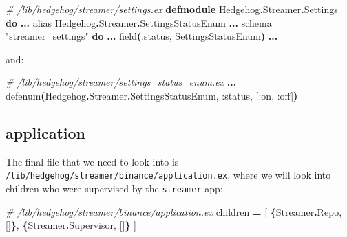 \documentclass[
  oneside]{book}
\newenvironment{Shaded}{\begin{snugshade}}{\end{snugshade}}
\newcommand{\CommentTok}[1]{\textcolor[rgb]{0.56,0.35,0.01}{\textit{#1}}}
\newcommand{\ConstantTok}[1]{\textcolor[rgb]{0.56,0.35,0.01}{#1}}
\newcommand{\FunctionTok}[1]{\textcolor[rgb]{0.13,0.29,0.53}{\textbf{#1}}}
\newcommand{\ImportTok}[1]{#1}
\newcommand{\KeywordTok}[1]{\textcolor[rgb]{0.13,0.29,0.53}{\textbf{#1}}}
\newcommand{\NormalTok}[1]{#1}
\newcommand{\OperatorTok}[1]{\textcolor[rgb]{0.81,0.36,0.00}{\textbf{#1}}}
\newcommand{\OtherTok}[1]{\textcolor[rgb]{0.56,0.35,0.01}{#1}}
\newcommand{\StringTok}[1]{\textcolor[rgb]{0.31,0.60,0.02}{#1}}
\newcommand{\VariableTok}[1]{\textcolor[rgb]{0.00,0.00,0.00}{#1}}
\begin{document}
\begin{Shaded}
\begin{Highlighting}[]
\CommentTok{\# /lib/hedgehog/streamer/settings.ex}
\KeywordTok{defmodule} \ConstantTok{Hedgehog}\OperatorTok{.}\ConstantTok{Streamer}\OperatorTok{.}\ConstantTok{Settings} \KeywordTok{do}
  \OperatorTok{...}
  \ImportTok{alias} \ConstantTok{Hedgehog}\OperatorTok{.}\ConstantTok{Streamer}\OperatorTok{.}\ConstantTok{SettingsStatusEnum}
  \OperatorTok{...}
\NormalTok{  schema }\StringTok{"streamer\_settings"} \KeywordTok{do}
    \OperatorTok{...}
\NormalTok{    field}\FunctionTok{(}\VariableTok{:status}\NormalTok{, }\ConstantTok{SettingsStatusEnum}\FunctionTok{)}
  \OperatorTok{...}
\end{Highlighting}
\end{Shaded}

and:

\begin{Shaded}
\begin{Highlighting}[]
\CommentTok{\# /lib/hedgehog/streamer/settings\_status\_enum.ex}
\OperatorTok{...}
\NormalTok{defenum}\FunctionTok{(}\ConstantTok{Hedgehog}\OperatorTok{.}\ConstantTok{Streamer}\OperatorTok{.}\ConstantTok{SettingsStatusEnum}\NormalTok{, }\VariableTok{:status}\NormalTok{, }\OtherTok{[}\VariableTok{:on}\NormalTok{, }\VariableTok{:off}\OtherTok{]}\FunctionTok{)}
\end{Highlighting}
\end{Shaded}

\subsection{application}\label{application}

The final file that we need to look into is \texttt{/lib/hedgehog/streamer/binance/application.ex}, where we will look into children who were supervised by the \texttt{streamer} app:

\begin{Shaded}
\begin{Highlighting}[]
\CommentTok{\# /lib/hedgehog/streamer/binance/application.ex}
\NormalTok{    children }\OperatorTok{=} \OtherTok{[}
      \FunctionTok{\{}\ConstantTok{Streamer}\OperatorTok{.}\ConstantTok{Repo}\NormalTok{, }\OtherTok{[]}\FunctionTok{\}}\NormalTok{,}
      \FunctionTok{\{}\ConstantTok{Streamer}\OperatorTok{.}\ConstantTok{Supervisor}\NormalTok{, }\OtherTok{[]}\FunctionTok{\}}
    \OtherTok{]}
\end{Highlighting}
\end{Shaded}
\end{document}

